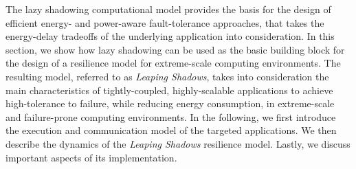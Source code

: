 




%



The lazy shadowing computational model provides the basis for the design of efficient energy- and power-aware fault-tolerance approaches, that takes the energy-delay tradeoffs of the underlying application into consideration. In this section, we show how lazy shadowing can be used as the basic building block for the design of a resilience model for extreme-scale computing environments. The resulting model, referred to as {\it Leaping Shadows}, takes into consideration the main characteristics of tightly-coupled, highly-scalable applications to achieve high-tolerance to failure, while reducing energy consumption, in extreme-scale and failure-prone computing environments. In the following, we first introduce the execution and communication model of the targeted applications. We then describe the dynamics of the {\it Leaping Shadows} resilience model. Lastly, we discuss important aspects of its implementation. 


